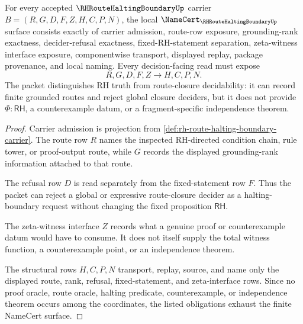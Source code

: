 \begin{theorem}
\label{thm:rh-route-halting-boundary-namecert-obligations}
For every accepted $\RHRouteHaltingBoundaryUp$ carrier $B=(R,G,D,F,Z,H,C,P,N)$, the local $\NameCert_{\RHRouteHaltingBoundaryUp}$ surface consists exactly of carrier admission, route-row exposure, grounding-rank exactness, decider-refusal exactness, fixed-RH-statement separation, zeta-witness interface exposure, componentwise transport, displayed replay, package provenance, and local naming. Every decision-facing read must expose
$$
R,G,D,F,Z \longrightarrow H,C,P,N .
$$
The packet distinguishes RH truth from route-closure decidability: it can record finite grounded routes and reject global closure deciders, but it does not provide $\Phi:\mathsf{RH}$, a counterexample datum, or a fragment-specific independence theorem.
\end{theorem}
\begin{proof}
Carrier admission is projection from \autoref{def:rh-route-halting-boundary-carrier}. The route row $R$ names the inspected RH-directed condition chain, rule tower, or proof-output route, while $G$ records the displayed grounding-rank information attached to that route.

The refusal row $D$ is read separately from the fixed-statement row $F$. Thus the packet can reject a global or expressive route-closure decider as a halting-boundary request without changing the fixed proposition $\mathsf{RH}$.

The zeta-witness interface $Z$ records what a genuine proof or counterexample datum would have to consume. It does not itself supply the total witness function, a counterexample point, or an independence theorem.

The structural rows $H,C,P,N$ transport, replay, source, and name only the displayed route, rank, refusal, fixed-statement, and zeta-interface rows. Since no proof oracle, route oracle, halting predicate, counterexample, or independence theorem occurs among the coordinates, the listed obligations exhaust the finite NameCert surface.
\end{proof}


